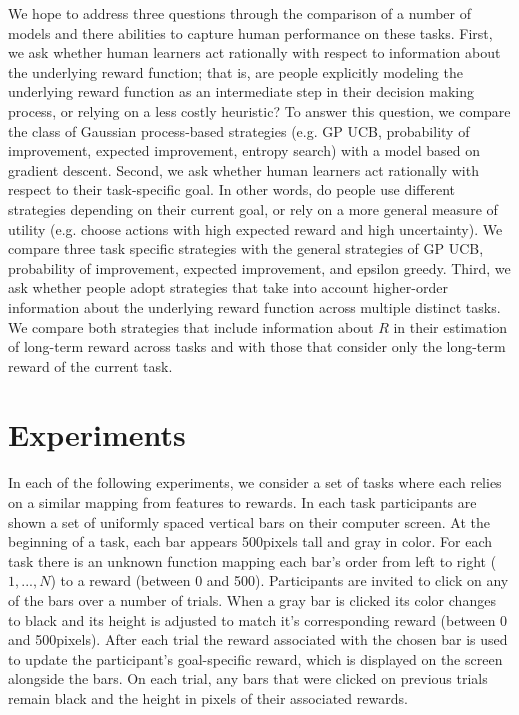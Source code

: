\documentclass[10pt,letterpaper]{article}
\def\maxheight{500}
\begin{document}
	We hope to address three questions through the comparison of a number of models and there abilities to capture human performance on these tasks. First, we ask whether human learners act rationally with respect to information about the underlying reward function; that is, are people explicitly modeling the underlying reward function as an intermediate step in their decision making process, or relying on a less costly heuristic? To answer this question, we compare the class of Gaussian process-based strategies (e.g. GP UCB, probability of improvement, expected improvement, entropy search) with a model based on gradient descent. Second, we ask whether human learners act rationally with respect to their task-specific goal. In other words, do people use different strategies depending on their current goal, or rely on a more general measure of utility (e.g. choose actions with high expected reward and high uncertainty). We compare three task specific strategies with the general strategies of GP UCB, probability of improvement, expected improvement, and epsilon greedy. Third, we ask whether people adopt strategies that take into account higher-order information about the underlying reward function across multiple distinct tasks. We compare both strategies that include information about $R$ in their estimation of long-term reward across tasks and with those that consider only the long-term reward of the current task.
	
	\section{Experiments}
	
	In each of the following experiments, we consider a set of tasks where each relies on a similar mapping from features to rewards. In each task participants are shown a set of uniformly spaced vertical bars on their computer screen. At the beginning of a task, each bar appears \maxheight \space pixels tall and gray in color. For each task there is an unknown function mapping each bar's order from left to right ($1,...,N$) to a reward (between 0 and \maxheight \space). Participants are invited to click on any of the bars over a number of trials. When a gray bar is clicked its color changes to black and its height is adjusted to match it's corresponding reward (between 0 and \maxheight \space pixels). After each trial the reward associated with the chosen bar is used to update the participant's goal-specific reward, which is displayed on the screen alongside the bars. On each trial, any bars that were clicked on previous trials remain black and the height in pixels of their associated rewards.
	
\end{document}
